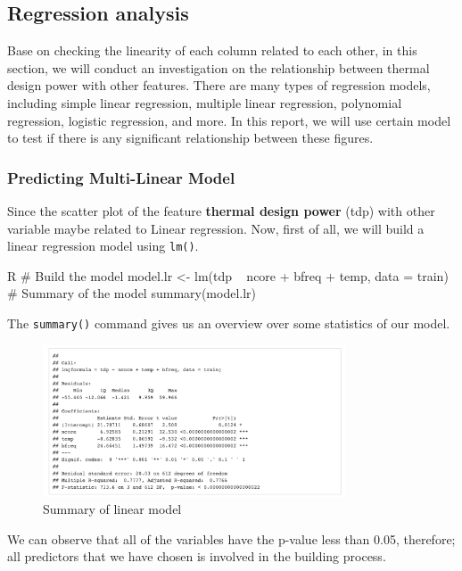 









\subsection{Regression analysis}
\noindent 

Base on checking the linearity of each column related to each other, in this section, we will conduct an investigation on the relationship between thermal design power with other features. There are many types of regression models, including simple linear regression, multiple linear regression, polynomial regression, logistic regression, and more. In this report, we will use certain model to test if there is any significant relationship between these figures.
\subsubsection{Predicting Multi-Linear Model}
\label{section:data_analysis_linear}

Since the scatter plot of the feature \textbf{thermal design power} (tdp) with other variable maybe related to Linear regression.
Now, first of all, we will build a linear regression model using \verb|lm()|.
\begin{code}{R}
# Build the model
model.lr <- lm(tdp ~ ncore + bfreq + temp, data = train)
# Summary of the model
summary(model.lr)
\end{code}

The \verb|summary()| command gives us an overview over some statistics of our model.
\begin{figure}[H]
    \centering
    \includegraphics[width=0.8\textwidth]{graphics/linear_summary.png}
    \caption{Summary of linear model}
    \label{fig:30}
\end{figure}
We can observe that all of the variables have the p-value less than 0.05, therefore; all predictors that we have chosen is involved in the building process.

